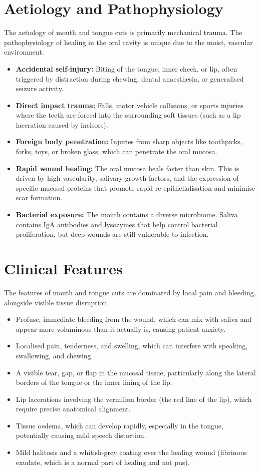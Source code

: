 \section*{Aetiology and Pathophysiology}
The aetiology of mouth and tongue cuts is primarily mechanical trauma. The pathophysiology of healing in the oral cavity is unique due to the moist, vascular environment.
\begin{itemize}
    \item \textbf{Accidental self-injury:} Biting of the tongue, inner cheek, or lip, often triggered by distraction during chewing, dental anaesthesia, or generalised seizure activity.
    \item \textbf{Direct impact trauma:} Falls, motor vehicle collisions, or sports injuries where the teeth are forced into the surrounding soft tissues (such as a lip laceration caused by incisors).
    \item \textbf{Foreign body penetration:} Injuries from sharp objects like toothpicks, forks, toys, or broken glass, which can penetrate the oral mucosa.
    \item \textbf{Rapid wound healing:} The oral mucosa heals faster than skin. This is driven by high vascularity, salivary growth factors, and the expression of specific mucosal proteins that promote rapid re-epithelialisation and minimise scar formation.
    \item \textbf{Bacterial exposure:} The mouth contains a diverse microbiome. Saliva contains IgA antibodies and lysozymes that help control bacterial proliferation, but deep wounds are still vulnerable to infection.
\end{itemize}

\section*{Clinical Features}
The features of mouth and tongue cuts are dominated by local pain and bleeding, alongside visible tissue disruption.
\begin{itemize}
    \item Profuse, immediate bleeding from the wound, which can mix with saliva and appear more voluminous than it actually is, causing patient anxiety.
    \item Localised pain, tenderness, and swelling, which can interfere with speaking, swallowing, and chewing.
    \item A visible tear, gap, or flap in the mucosal tissue, particularly along the lateral borders of the tongue or the inner lining of the lip.
    \item Lip lacerations involving the vermilion border (the red line of the lip), which require precise anatomical alignment.
    \item Tissue oedema, which can develop rapidly, especially in the tongue, potentially causing mild speech distortion.
    \item Mild halitosis and a whitish-grey coating over the healing wound (fibrinous exudate, which is a normal part of healing and not pus).
\end{itemize}

